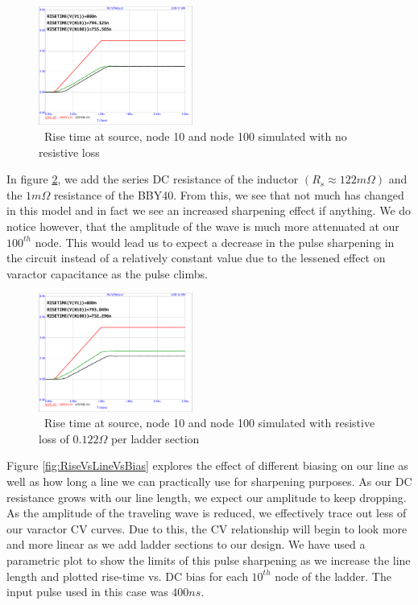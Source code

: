 \documentclass[journal]{IEEEtran} \usepackage[english]{babel}
\begin{document}
\begin{figure}[htb]
\centering
\includegraphics[width=0.45\textwidth,page = 1]{risetimeGuessNOLoss.pdf}
\caption{\ Rise time at source, node 10 and node 100 simulated with no resistive loss
}\label{fig:riseNoLoss}
\end{figure}

In figure \ref{fig:riseWithLoss}, we add the series DC resistance of the
inductor $(R_s \approx 122m\Omega)$ and the $1m\Omega$ resistance of the BBY40. 
From this, we see that not much has changed in this model and in fact we see an
increased sharpening effect if anything. We do notice however, that the
amplitude of the wave is much more attenuated at our $100^{th}$ node. This would
lead us to expect a decrease in the pulse sharpening in the circuit instead of a
relatively constant value due to the lessened effect on varactor capacitance as
the pulse climbs.

\begin{figure}[htb]
\centering
\includegraphics[width=0.45\textwidth,page = 1]{risetimeGuessWLoss.pdf}
\caption{\ Rise time at source, node 10 and node 100 simulated with resistive loss of $0.122\Omega$ per ladder section 
}\label{fig:riseWithLoss}
\end{figure}

 
 Figure \ref{fig:RiseVsLineVsBias} explores the effect of different biasing on
 our line as well as how long a line we can practically use for sharpening
 purposes. As our DC resistance grows with our line length, we expect our
 amplitude to keep dropping. As the amplitude of the traveling wave is reduced,
 we effectively trace out less of our varactor CV curves. Due to this, the CV
 relationship will begin to look more and more linear as we add ladder sections
 to our design. We have used a parametric plot to show the limits of this pulse
 sharpening as we increase  the line length and plotted rise-time vs. DC bias
 for each $10^{th}$ node of the ladder. The input pulse used in this case was
 $400ns$.
\end{document}
